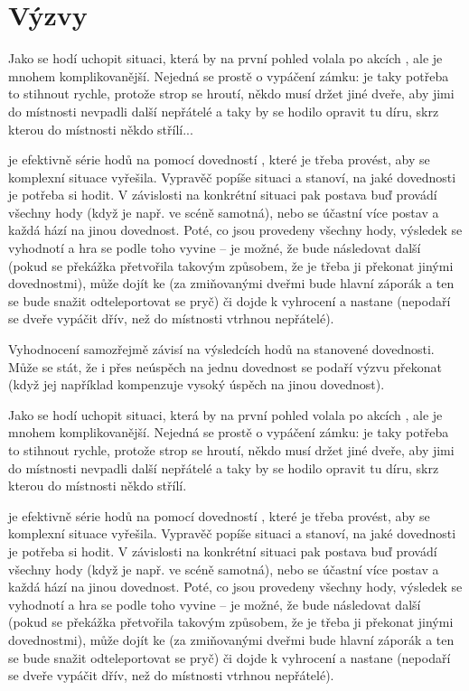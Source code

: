 \documentclass[../main.tex]{subfiles}
\begin{document}
\section{Výzvy}
\label{sec:vyzvy}

Jako  se hodí uchopit situaci, která by na první pohled volala po akcích
, ale je mnohem komplikovanější. Nejedná se prostě o vypáčení zámku: je
taky potřeba to stihnout rychle, protože strop se hroutí, někdo musí držet jiné dveře,
aby jimi do místnosti nevpadli další nepřátelé a taky by se hodilo opravit tu díru, skrz
kterou do místnosti někdo střílí...

 je efektivně série hodů na  pomocí  dovedností
, které je třeba provést, aby se komplexní situace vyřešila.
Vypravěč popíše situaci a stanoví, na jaké dovednosti je potřeba si hodit. V závislosti
na konkrétní situaci pak postava buď provádí všechny hody (když je např. ve scéně
samotná), nebo se  účastní více postav a každá hází na jinou dovednost. Poté,
co jsou provedeny všechny hody, výsledek  se vyhodnotí a hra se podle toho
vyvine – je možné, že bude následovat další  (pokud se překážka přetvořila
takovým způsobem, že je třeba ji překonat jinými dovednostmi), může dojít ke 
(za zmiňovanými dveřmi bude hlavní záporák a ten se bude snažit odteleportovat se pryč)
či dojde k vyhrocení a nastane  (nepodaří se dveře vypáčit dřív, než do
místnosti vtrhnou nepřátelé).

Vyhodnocení  samozřejmě závisí na výsledcích hodů na stanovené dovednosti.
Může se stát, že i přes neúspěch na jednu dovednost se podaří výzvu překonat (když jej
například kompenzuje vysoký úspěch na jinou dovednost).

Jako  se hodí uchopit situaci, která by na první pohled volala po akcích
, ale je mnohem komplikovanější. Nejedná se prostě o vypáčení zámku: je
taky potřeba to stihnout rychle, protože strop se hroutí, někdo musí držet jiné dveře,
aby jimi do místnosti nevpadli další nepřátelé a taky by se hodilo opravit tu díru, skrz
kterou do místnosti někdo střílí.

 je efektivně série hodů na  pomocí  dovedností
, které je třeba provést, aby se komplexní situace vyřešila.
Vypravěč popíše situaci a stanoví, na jaké dovednosti je potřeba si hodit. V závislosti
na konkrétní situaci pak postava buď provádí všechny hody (když je např. ve scéně
samotná), nebo se  účastní více postav a každá hází na jinou dovednost. Poté,
co jsou provedeny všechny hody, výsledek  se vyhodnotí a hra se podle toho
vyvine – je možné, že bude následovat další  (pokud se překážka přetvořila
takovým způsobem, že je třeba ji překonat jinými dovednostmi), může dojít ke 
(za zmiňovanými dveřmi bude hlavní záporák a ten se bude snažit odteleportovat se pryč)
či dojde k vyhrocení a nastane  (nepodaří se dveře vypáčit dřív, než do
místnosti vtrhnou nepřátelé).
\end{document}
